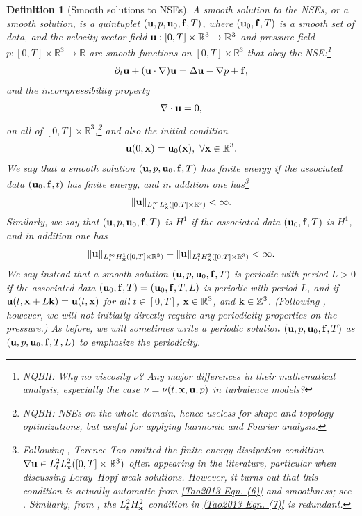 \documentclass{article}
\numberwithin{equation}{section}
\newtheorem{definition}{Definition}[section]
\begin{document}
\begin{definition}[Smooth solutions to NSEs]
	A \emph{smooth solution to the NSEs}, or a \emph{smooth solution}, is a quintuplet $({\bf u},p,{\bf u}_0,{\bf f},T)$, where $({\bf u}_0,{\bf f},T)$ is a smooth set of data, and the velocity vector field ${\bf u}:[0,T]\times\mathbb{R}^3\to\mathbb{R}^3$ and pressure field $p:[0,T]\times\mathbb{R}^3\to\mathbb{R}$ are smooth functions on $[0,T]\times\mathbb{R}^3$ that obey the NSE:\footnote{NQBH: Why no viscosity $\nu$? Any major differences in their mathematical analysis, especially the case $\nu = \nu(t,{\bf x},{\bf u},p)$ in turbulence models?}
	\begin{align}
		\partial_t{\bf u} + ({\bf u}\cdot\nabla){\bf u} = \Delta{\bf u} - \nabla p + {\bf f},
	\end{align}
	and the incompressibility property
	\begin{align}
		\nabla\cdot{\bf u} = 0,
	\end{align}
	on all of $[0,T]\times\mathbb{R}^3$,\footnote{NQBH: NSEs on the whole domain, hence useless for shape and topology optimizations, but useful for applying harmonic and Fourier analysis.} and also the initial condition
	\begin{align}
		{\bf u}(0,{\bf x}) = {\bf u}_0({\bf x}),\ \forall{\bf x}\in\mathbb{R}^3.
	\end{align}
	We say that a smooth solution $({\bf u},p,{\bf u}_0,{\bf f},T)$ has \emph{finite energy} if the associated data $({\bf u}_0,{\bf f},t)$ has finite energy, and in addition one has\footnote{Following \cite{Fefferman2006}, Terence Tao omitted the \textit{finite energy dissipation condition} $\nabla{\bf u}\in L_t^2L_{\bf x}^2([0,T]\times\mathbb{R}^3)$ often appearing in the literature, particular when discussing \textit{Leray--Hopf weak solutions}. However, it turns out that this condition is actually automatic from \eqref{Tao2013 Eqn. (6)} and smoothness; see \cite[Lem. 8.1]{Tao2013}. Similarly, from \cite[Corollary 11.1]{Tao2013}, the $L_t^2H_{\bf x}^2$ condition in \eqref{Tao2013 Eqn. (7)} is redundant.}
	\begin{align}
		\label{Tao2013 Eqn. (6)}
		\|{\bf u}\|_{L_t^\infty L_{\bf x}^2([0,T]\times\mathbb{R}^3)} < \infty.
	\end{align}
	Similarly, we say that \emph{$({\bf u},p,{\bf u}_0,{\bf f},T)$ is $H^1$} if the associated data $({\bf u}_0,{\bf f},T)$ is $H^1$, and in addition one has
	\begin{align}
		\label{Tao2013 Eqn. (7)}
		\|{\bf u}\|_{L_t^\infty H_{\bf x}^1([0,T]\times\mathbb{R}^3)} + \|{\bf u}\|_{L_t^2H_{\bf x}^2([0,T]\times\mathbb{R}^3)} < \infty.
	\end{align}
	We say instead that a smooth solution $({\bf u},p,{\bf u}_0,{\bf f},T)$ is \emph{periodic} with period $L > 0$ if the associated data $({\bf u}_0,{\bf f},T) = ({\bf u}_0,{\bf f},T,L)$ is periodic with period $L$, and if ${\bf u}(t,{\bf x} + L{\bf k}) = {\bf u}(t,{\bf x})$ for all $t\in[0,T]$, ${\bf x}\in\mathbb{R}^3$, and ${\bf k}\in\mathbb{Z}^3$. (Following \cite{Fefferman2006}, however, we will not initially directly require any periodicity properties on the pressure.) As before, we will sometimes write a periodic solution $({\bf u},p,{\bf u}_0,{\bf f},T)$ as $({\bf u},p,{\bf u}_0,{\bf f},T,L)$ to emphasize the periodicity.
\end{definition}
\end{document}
